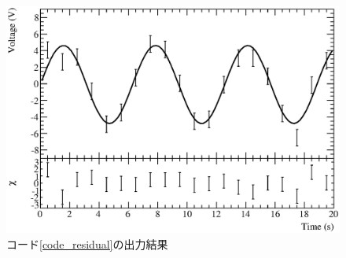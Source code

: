 \begin{figure}
  \centering
  \includegraphics[width=12cm,clip]{fig/residual.eps}
  \caption{コード\ref{code_residual}の出力結果}
  \label{fig_residual_eps}
\end{figure}

\begin{NoFloat}

\end{NoFloat}
